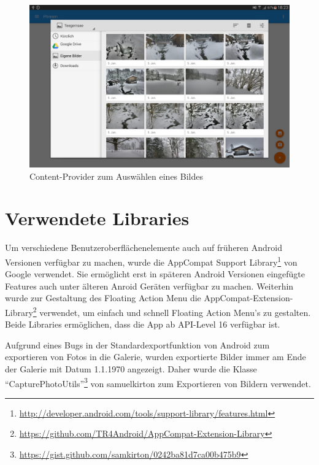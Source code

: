 \begin{figure}[H]
\centering
\includegraphics[scale=0.17]{images/screenshots/content_provider.png}
\caption{Content-Provider zum Auswählen eines Bildes}
\label{label:content_provider}
\end{figure}

\section{Verwendete Libraries}
Um verschiedene Benutzeroberflächenelemente auch auf früheren Android Versionen verfügbar zu machen, wurde die AppCompat Support Library\footnote{\url{http://developer.android.com/tools/support-library/features.html}} von Google verwendet. Sie ermöglicht erst in späteren Android Versionen eingefügte Features auch unter älteren Anroid Geräten verfügbar zu machen. Weiterhin wurde zur Gestaltung des Floating Action Menu die AppCompat-Extension-Library\footnote{\url{https://github.com/TR4Android/AppCompat-Extension-Library}} verwendet, um einfach und schnell Floating Action Menu's zu gestalten. Beide Libraries ermöglichen, dass die App ab API-Level 16 verfügbar ist.

Aufgrund eines Bugs in der Standardexportfunktion von Android zum exportieren von Fotos in die Galerie, wurden exportierte Bilder immer am Ende der Galerie mit Datum 1.1.1970 angezeigt. Daher wurde die Klasse \enquote{CapturePhotoUtils}\footnote{\url{https://gist.github.com/samkirton/0242ba81d7ca00b475b9}} von samuelkirton zum Exportieren von Bildern verwendet.